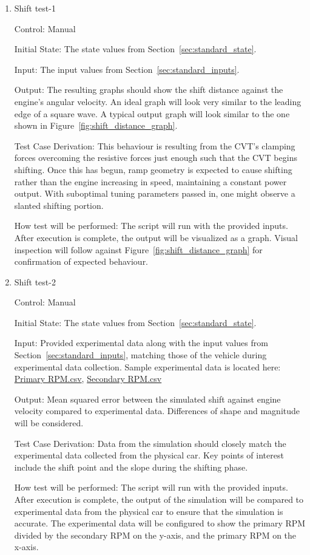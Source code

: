 \documentclass[12pt, titlepage]{article}
\begin{document}
\begin{enumerate}
  
  \item{Shift test-1\\}
  
  Control: Manual
            
  Initial State: The state values from Section~\ref{sec:standard_state}.
  
  Input: The input values from Section~\ref{sec:standard_inputs}.
            
  Output: The resulting graphs should show the shift distance against the engine's angular velocity. An ideal graph will look very similar to the leading edge of a square wave. A typical output graph will look similar to the one shown in Figure~\ref{fig:shift_distance_graph}.
  
  Test Case Derivation: This behaviour is resulting from the CVT's clamping forces overcoming the resistive forces just enough such that the CVT begins shifting. Once this has begun, ramp geometry is expected to cause shifting rather than the engine increasing in speed, maintaining a constant power output. With suboptimal tuning parameters passed in, one might observe a slanted shifting portion.
  
  How test will be performed: The script will run with the provided inputs. After execution is complete, the output will be visualized as a graph. Visual inspection will follow against Figure~\ref{fig:shift_distance_graph} for confirmation of expected behaviour.
  
  \item{Shift test-2\\}

  Control: Manual

  Initial State: The state values from Section~\ref{sec:standard_state}.

  Input: Provided experimental data along with the input values from Section~\ref{sec:standard_inputs}, matching those of the vehicle during experimental data collection. Sample experimental data is located here: \href{https://github.com/gr812b/CVT-Simulator/experimental-data/RPM%20PRIM.csv}{Primary RPM.csv}, \href{https://github.com/gr812b/CVT-Simulator/experimental-data/RPM%20SEC.csv}{Secondary RPM.csv} 

  Output: Mean squared error between the simulated shift against engine velocity compared to experimental data. Differences of shape and magnitude will be considered.

  Test Case Derivation: Data from the simulation should closely match the experimental data collected from the physical car. Key points of interest include the shift point and the slope during the shifting phase.

  How test will be performed: The script will run with the provided inputs. After execution is complete, the output of the simulation will be compared to experimental data from the physical car to ensure that the simulation is accurate. The experimental data will be configured to show the primary RPM divided by the secondary RPM on the y-axis, and the primary RPM on the x-axis.

\end{enumerate}
\end{document}
